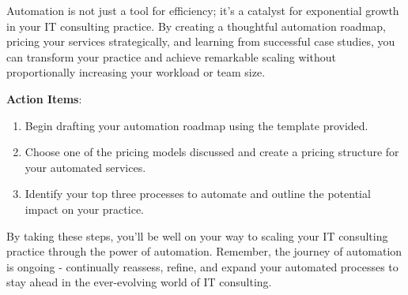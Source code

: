 Automation is not just a tool for efficiency; it's a catalyst for exponential growth in your IT consulting practice. By creating a thoughtful automation roadmap, pricing your services strategically, and learning from successful case studies, you can transform your practice and achieve remarkable scaling without proportionally increasing your workload or team size.

\textbf{Action Items}:
\begin{enumerate}
    \item Begin drafting your automation roadmap using the template provided.
    \item Choose one of the pricing models discussed and create a pricing structure for your automated services.
    \item Identify your top three processes to automate and outline the potential impact on your practice.
\end{enumerate}


By taking these steps, you'll be well on your way to scaling your IT consulting practice through the power of automation. Remember, the journey of automation is ongoing - continually reassess, refine, and expand your automated processes to stay ahead in the ever-evolving world of IT consulting.